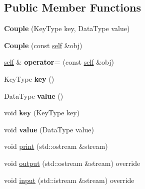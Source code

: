 \subsection*{Public Member Functions}
\begin{DoxyCompactItemize}
\item 
\mbox{\label{classez_1_1objects_1_1Couple_acd2e20b5517b26e706422b8ae8cd057d}} 
{\bfseries Couple} (Key\+Type key, Data\+Type value)
\item 
\mbox{\label{classez_1_1objects_1_1Couple_aaba5bcdeaa9e0fc1db029ebc4461d6ed}} 
{\bfseries Couple} (const \hyperlink{classez_1_1objects_1_1Couple}{self} \&obj)
\item 
\mbox{\label{classez_1_1objects_1_1Couple_a0c08f038504e934e85c9d09259485e48}} 
\hyperlink{classez_1_1objects_1_1Couple}{self} \& {\bfseries operator=} (const \hyperlink{classez_1_1objects_1_1Couple}{self} \&obj)
\item 
\mbox{\label{classez_1_1objects_1_1Couple_a09ee264ed12d54a23754647093547f4b}} 
Key\+Type {\bfseries key} ()
\item 
\mbox{\label{classez_1_1objects_1_1Couple_ad4a097e8ae5cd40ede29e42f07c37308}} 
Data\+Type {\bfseries value} ()
\item 
\mbox{\label{classez_1_1objects_1_1Couple_afcadb12392164022eaf614c61ccf0eb7}} 
void {\bfseries key} (Key\+Type key)
\item 
\mbox{\label{classez_1_1objects_1_1Couple_af8c5fd127c385aef53c6a2028558e04c}} 
void {\bfseries value} (Data\+Type value)
\item 
void \hyperlink{classez_1_1objects_1_1Couple_ab419858cd3ca8fa27f637ece04d52a97}{print} (std\+::ostream \&stream)
\item 
void \hyperlink{classez_1_1objects_1_1Couple_a7d64b5194ac6092bc553d97fedbe23ad}{output} (std\+::ostream \&stream) override
\item 
void \hyperlink{classez_1_1objects_1_1Couple_a4f7228308e803711bd6866c367e18d06}{input} (std\+::istream \&stream) override
\item 

\end{DoxyCompactItemize}
